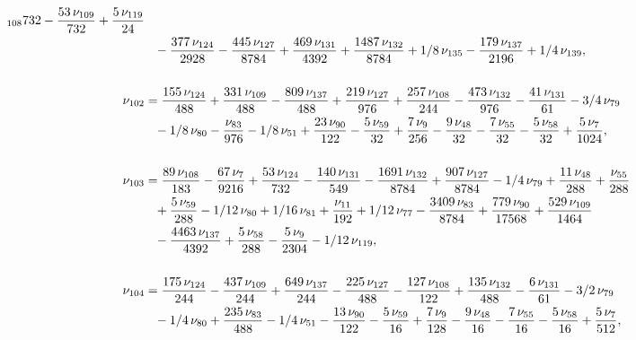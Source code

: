 \documentclass[a4paper,12pt, DIV=14, BCOR=5mm, twoside, headsepline, numbers=noenddot]{scrbook}
\begin{document}
\begin{align}
\begin{aligned}
{{_{{108}}}{732}}-{\frac {53\,\nu_{{109}}}{732}}+{\frac {5\,\nu_{{119}}
}{24}}\\
 &\hphantom{=}-{\frac {377\,\nu_{{124}}}{2928}}-{\frac {445\,\nu_{{127}}}{8784
}}+{\frac {469\,\nu_{{131}}}{4392}}+{\frac {1487\,\nu_{{132}}}{8784}}+
1/8\,\nu_{{135}}-{\frac {179\,\nu_{{137}}}{2196}}+1/4\,\nu_{{139}}, \\
\\
\nu
_{{102}}&={\frac {155\,\nu_{{124}}}{488}}+{\frac {331\,\nu_{{109}}}{488
}}-{\frac {809\,\nu_{{137}}}{488}}+{\frac {219\,\nu_{{127}}}{976}}+{
\frac {257\,\nu_{{108}}}{244}}-{\frac {473\,\nu_{{132}}}{976}}-{\frac 
{41\,\nu_{{131}}}{61}}-3/4\,\nu_{{79}}\\
 &\hphantom{=}-1/8\,\nu_{{80}}-{\frac {\nu_{{
83}}}{976}}-1/8\,\nu_{{51}}+{\frac {23\,\nu_{{90}}}{122}}-{\frac {5\,
\nu_{{59}}}{32}}+{\frac {7\,\nu_{{9}}}{256}}-{\frac {9\,\nu_{{48}}}{32
}}-{\frac {7\,\nu_{{55}}}{32}}-{\frac {5\,\nu_{{58}}}{32}}+{\frac {5\,
\nu_{{7}}}{1024}}, \\
\\
\nu_{{103}}&={\frac {89\,\nu_{{108}}}{183}}-{\frac {
67\,\nu_{{7}}}{9216}}+{\frac {53\,\nu_{{124}}}{732}}-{\frac {140\,\nu_
{{131}}}{549}}-{\frac {1691\,\nu_{{132}}}{8784}}+{\frac {907\,\nu_{{
127}}}{8784}}-1/4\,\nu_{{79}}+{\frac {11\,\nu_{{48}}}{288}}+{\frac {
\nu_{{55}}}{288}}\\
 &\hphantom{=}+{\frac {5\,\nu_{{59}}}{288}}-1/12\,\nu_{{80}}+1/16\,
\nu_{{81}}+{\frac {\nu_{{11}}}{192}}+1/12\,\nu_{{77}}-{\frac {3409\,
\nu_{{83}}}{8784}}+{\frac {779\,\nu_{{90}}}{17568}}+{\frac {529\,\nu_{
{109}}}{1464}}\\
 &\hphantom{=}-{\frac {4463\,\nu_{{137}}}{4392}}+{\frac {5\,\nu_{{58}}
}{288}}-{\frac {5\,\nu_{{9}}}{2304}}-1/12\,\nu_{{119}}, \\
\\
\nu_{{104}}&={
\frac {175\,\nu_{{124}}}{244}}-{\frac {437\,\nu_{{109}}}{244}}+{\frac 
{649\,\nu_{{137}}}{244}}-{\frac {225\,\nu_{{127}}}{488}}-{\frac {127\,
\nu_{{108}}}{122}}+{\frac {135\,\nu_{{132}}}{488}}-{\frac {6\,\nu_{{
131}}}{61}}-3/2\,\nu_{{79}}\\
 &\hphantom{=}-1/4\,\nu_{{80}}+{\frac {235\,\nu_{{83}}}{
488}}-1/4\,\nu_{{51}}-{\frac {13\,\nu_{{90}}}{122}}-{\frac {5\,\nu_{{
59}}}{16}}+{\frac {7\,\nu_{{9}}}{128}}-{\frac {9\,\nu_{{48}}}{16}}-{
\frac {7\,\nu_{{55}}}{16}}-{\frac {5\,\nu_{{58}}}{16}}+{\frac {5\,\nu_
{{7}}}{512}}, 
\end{aligned}
\end{align}
\end{document}
